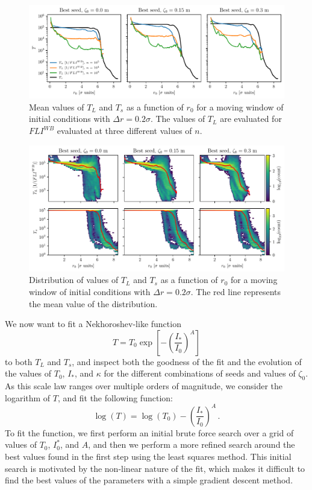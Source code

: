 \begin{figure}
    \centering
    \includegraphics[width=1\textwidth]{6_lhc_dynamic_indicators/figs/lyapunov_time_vs_radius.pdf}
    \caption{Mean values of $T_L$ and $T_s$ as a function of $r_0$ for a moving window of initial conditions with $\Delta r = 0.2\sigma$. The values of $T_L$ are evaluated for $FLI^{{WB}}$ evaluated at three different values of $n$.}
    \label{fig:ts_vs_tl}
\end{figure}

\begin{figure}
    \centering
    \includegraphics[width=1\textwidth]{6_lhc_dynamic_indicators/figs/dist_and_mean.pdf}
    \caption{Distribution of values of $T_L$ and $T_s$ as a function of $r_0$ for a moving window of initial conditions with $\Delta r = 0.2\sigma$. The red line represents the mean value of the distribution.}
    \label{fig:extra_distribution}
\end{figure}

We now want to fit a Nekhoroshev-like function
\begin{equation}
    T = T_0 \exp\left[-\left(\frac{I_\ast}{I_0}\right)^A\right]
\end{equation} 
to both $T_L$ and $T_s$, and inspect both the goodness of the fit and the evolution of the values of $T_0$, $I_\ast$, and $\kappa$ for the different combinations of seeds and values of $\zeta_0$. As this scale law ranges over multiple orders of magnitude, we consider the logarithm of $T$, and fit the following function:
\begin{equation}
    \log(T) = \log(T_0) - \left(\frac{I_\ast}{I_0}\right)^A \,.
\end{equation}
To fit the function, we first perform an initial brute force search over a grid of values of $T_0$, $I_0^*$, and $A$, and then we perform a more refined search around the best values found in the first step using the least squares method. This initial search is motivated by the non-linear nature of the fit, which makes it difficult to find the best values of the parameters with a simple gradient descent method.

